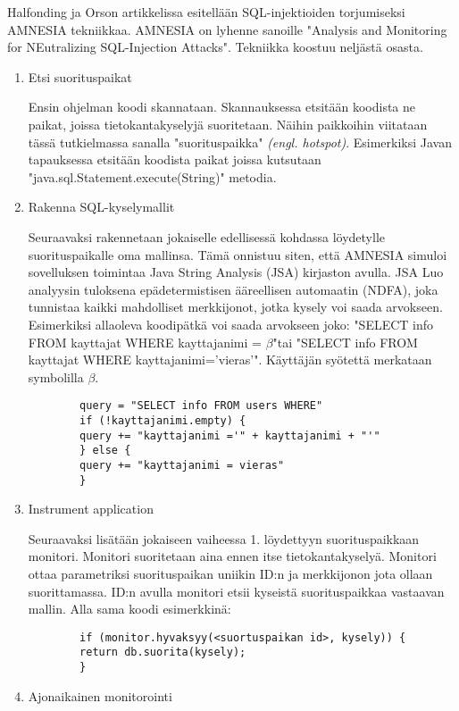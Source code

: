 \documentclass[finnish]{tktltiki2}
\theoremstyle{definition}
\theoremstyle{remark}
\begin{document}
	Halfonding ja Orson artikkelissa \cite{amnesia} esitellään SQL-injektioiden torjumiseksi AMNESIA tekniikkaa. AMNESIA on lyhenne sanoille "Analysis and Monitoring for NEutralizing SQL-Injection Attacks". Tekniikka koostuu neljästä osasta.
	\begin{enumerate}
		\item{Etsi suorituspaikat}
		
		Ensin ohjelman koodi skannataan. Skannauksessa etsitään koodista ne paikat, joissa tietokantakyselyjä suoritetaan. Näihin paikkoihin viitataan tässä tutkielmassa sanalla "suorituspaikka" \textit{(engl. hotspot)}. Esimerkiksi Javan tapauksessa etsitään koodista paikat joissa kutsutaan "java.sql.Statement.execute(String)" \space metodia.
		\item{Rakenna SQL-kyselymallit}
		
		Seuraavaksi rakennetaan jokaiselle edellisessä kohdassa löydetylle suorituspaikalle oma mallinsa. Tämä onnistuu siten, että AMNESIA simuloi sovelluksen toimintaa Java String Analysis (JSA) kirjaston avulla. JSA Luo analyysin tuloksena epädetermistisen ääreellisen automaatin (NDFA), joka tunnistaa kaikki mahdolliset merkkijonot, jotka kysely voi saada arvokseen. Esimerkiksi allaoleva koodipätkä voi saada arvokseen joko: 
		"SELECT info FROM kayttajat WHERE kayttajanimi = $\beta$"\space tai "SELECT info FROM kayttajat WHERE kayttajanimi='vieras'". Käyttäjän syötettä merkataan symbolilla $\beta$.
		
		\begin{lstlisting}
		query = "SELECT info FROM users WHERE"
		if (!kayttajanimi.empty) {
		query += "kayttajanimi ='" + kayttajanimi + "'"
		} else {
		query += "kayttajanimi = vieras"
		}
		\end{lstlisting}
		
		
		\item{Instrument application}
		
		Seuraavaksi lisätään jokaiseen vaiheessa 1. löydettyyn suorituspaikkaan monitori. Monitori suoritetaan aina ennen itse tietokantakyselyä. Monitori ottaa parametriksi suorituspaikan uniikin ID:n ja merkkijonon jota ollaan suorittamassa. ID:n avulla monitori etsii kyseistä suorituspaikkaa vastaavan mallin. Alla sama koodi esimerkkinä: 
		\begin{lstlisting}
		if (monitor.hyvaksyy(<suortuspaikan id>, kysely)) {
		return db.suorita(kysely);
		}
		\end{lstlisting}
		\item{Ajonaikainen monitorointi}
		

\end{enumerate}
\end{document}

